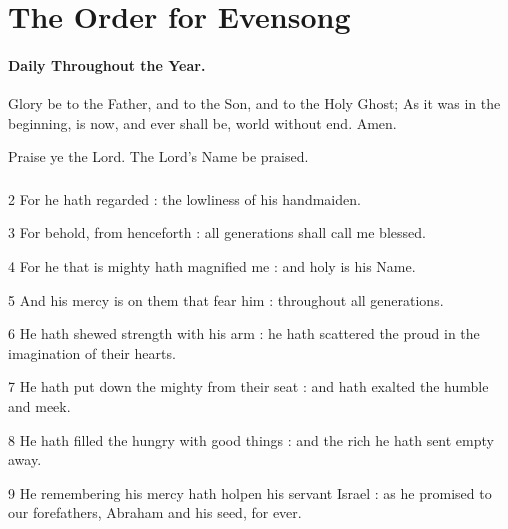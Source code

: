 \chapter{The Order for Evensong}
\subsubsection{Daily Throughout the Year.}



\V Glory be to the Father, and to the Son, and to the Holy Ghost;  \R As it was in the beginning, is now, and ever shall be, world without end. Amen.

\V Praise ye the Lord.  \R The Lord's Name be praised.

\medskip


\subsection{}


2 For he hath regarded : the lowliness of his handmaiden.

3 For behold, from henceforth : all generations shall call me blessed.

4 For he that is mighty hath magnified me : and holy is his Name.

5 And his mercy is on them that fear him : throughout all generations.

6 He hath shewed strength with his arm : he hath scattered the proud in the imagination of their hearts.

7 He hath put down the mighty from their seat : and hath exalted the humble and meek.

8 He hath filled the hungry with good things : and the rich he hath sent empty away.

9 He remembering his mercy hath holpen his servant Israel : as he promised to our forefathers, Abraham and his seed, for ever.

